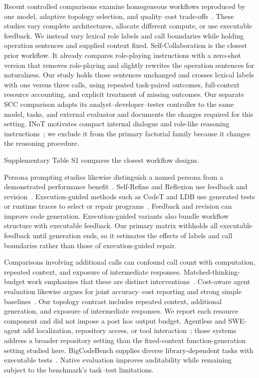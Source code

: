 \documentclass[pdflatex,sn-nature]{scientificreports}
\begin{document}
Recent controlled comparisons examine homogeneous workflows reproduced by one model, adaptive topology selection, and quality--cost trade-offs~\cite{xu2026oneflow,hong2026dats,kapoor2025agents}. These studies vary complete architectures, allocate different compute, or use executable feedback. We instead vary lexical role labels and call boundaries while holding operation sentences and supplied context fixed. Self-Collaboration is the closest prior workflow. It already compares role-playing instructions with a zero-shot version that removes role-playing and slightly rewrites the operation sentences for naturalness. Our study holds those sentences unchanged and crosses lexical labels with one versus three calls, using repeated task-paired outcomes, full-context resource accounting, and explicit treatment of missing outcomes. Our separate SCC comparison adapts its analyst--developer--tester controller to the same model, tasks, and external evaluator and documents the changes required for this setting. INoT motivates compact internal dialogue and role-like reasoning instructions~\cite{sun2025inot}; we exclude it from the primary factorial family because it changes the reasoning procedure.

Supplementary Table S1 compares the closest workflow designs.

Persona prompting studies likewise distinguish a named persona from a demonstrated performance benefit~\cite{zheng2024personas,araujo2025personas}. Self-Refine and Reflexion use feedback and revision~\cite{madaan2023selfrefine,shinn2023reflexion}. Execution-guided methods such as CodeT and LDB use generated tests or runtime traces to select or repair programs~\cite{chen2023codet,zhong2024ldb}. Feedback and revision can improve code generation. Execution-guided variants also bundle workflow structure with executable feedback. Our primary matrix withholds all executable feedback until generation ends, so it estimates the effects of labels and call boundaries rather than those of execution-guided repair.

Comparisons involving additional calls can confound call count with computation, repeated context, and exposure of intermediate responses. Matched-thinking-budget work emphasizes that these are distinct interventions~\cite{tran2026budget}. Cost-aware agent evaluation likewise argues for joint accuracy--cost reporting and strong simple baselines~\cite{kapoor2025agents}. Our topology contrast includes repeated context, additional generation, and exposure of intermediate responses. We report each resource component and did not impose a post hoc output budget. Agentless and SWE-agent add localization, repository access, or tool interaction~\cite{xia2025agentless,yang2024sweagent}; those systems address a broader repository setting than the fixed-context function-generation setting studied here. BigCodeBench supplies diverse library-dependent tasks with executable tests~\cite{zhuo2024bigcodebench}. Native evaluation improves auditability while remaining subject to the benchmark's task--test limitations.
\end{document}
